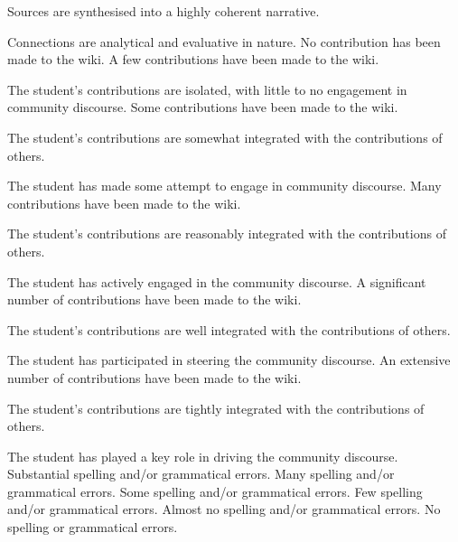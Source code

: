 \documentclass{../../fal_assignment}
\begin{document}
\begin{markingrubric}
        \grade		Sources are synthesised into a highly coherent narrative.
        \par		Connections are analytical and evaluative in nature.
%
        \grade\fail 	No contribution has been made to the wiki.
        \grade 		A few contributions have been made to the wiki.
		\par		The student's contributions are isolated, with little to no engagement in community discourse.
        \grade 		Some contributions have been made to the wiki.
        \par		The student's contributions are somewhat integrated with the contributions of others.
        \par		The student has made some attempt to engage in community discourse.
        \grade 		Many contributions have been made to the wiki.
        \par		The student's contributions are reasonably integrated with the contributions of others.
        \par		The student has actively engaged in the community discourse.
        \grade 		A significant number of contributions have been made to the wiki.
        \par		The student's contributions are well integrated with the contributions of others.
        \par		The student has participated in steering the community discourse.
        \grade 		An extensive number of contributions have been made to the wiki.
        \par		The student's contributions are tightly integrated with the contributions of others.
        \par		The student has played a key role in driving the community discourse.
%
        \grade\fail 	Substantial spelling and/or grammatical errors.
        \grade 		Many spelling and/or grammatical errors.
        \grade 		Some spelling and/or grammatical errors.  
        \grade 		Few spelling and/or grammatical errors.
        \grade 		Almost no spelling and/or grammatical errors.
        \grade 		No spelling or grammatical errors.
\end{markingrubric}
\end{document}
